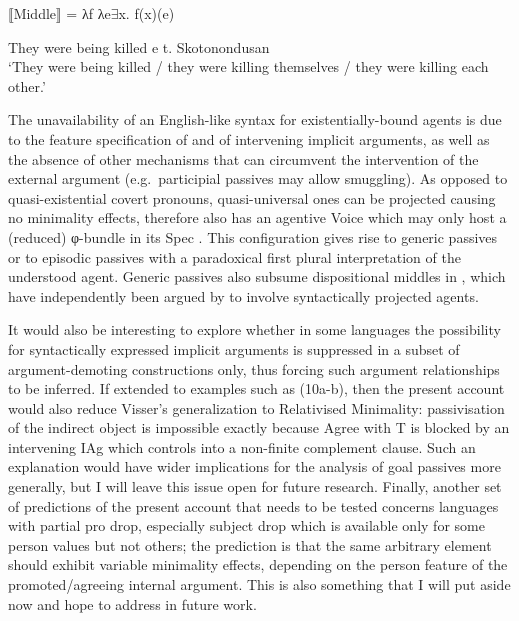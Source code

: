\documentclass[output=paper]{langsci/langscibook}
\begin{document}
\begin{exe}
    ⟦Middle⟧ = λf λe${\exists}$x. f(x)(e)\label{ex:key:22.6prime}
\end{exe}

\ea%
    \label{ex:key:22.49}
    \ea They were being killed e t.
    \ex Skotonondusan\\
        \enquote*{They were being killed / they were killing themselves / they
        were killing each other.}
    \z
\z

The unavailability of an English-like syntax for existentially-bound agents is
due to the feature specification of  and of intervening implicit
arguments, as well as the absence of other mechanisms that can circumvent the
intervention of the external argument (e.g.\ participial passives
may allow  smuggling). As opposed to quasi-existential
covert pronouns, quasi-universal ones can be projected causing no minimality
effects, therefore  also has an agentive  Voice which
may only host a (reduced) φ-bundle in its Spec \citep{Legate2014}. This
configuration gives rise to generic passives or to episodic
passives with a paradoxical first plural interpretation of the
understood agent. Generic passives also subsume dispositional middles in
, which have independently been argued by \citet{Lekakou2005} to
involve syntactically projected agents.

It would also be interesting to explore whether in some languages the
possibility for syntactically expressed implicit arguments is suppressed in a
subset of argument-demoting constructions only, thus forcing such argument
relationships to be inferred. If extended to examples such as (10a-b), then the
present account would also reduce Visser’s generalization to Relativised
Minimality: passivisation of the indirect object is impossible exactly because
Agree with T is blocked by an intervening \gls{IAg} which controls into a non-finite
complement clause. Such an explanation would have wider implications for the
analysis of goal passives more generally, but I will leave this issue open for
future research. Finally, another set of predictions of the present account
that needs to be tested concerns languages with partial pro drop, especially
subject drop which is available only for some person values but not others; the
prediction is that the same arbitrary element should exhibit variable
minimality effects, depending on the person feature of the promoted/agreeing
internal argument. This is also something that I will put aside now and hope to
address in future work.
\end{document}
